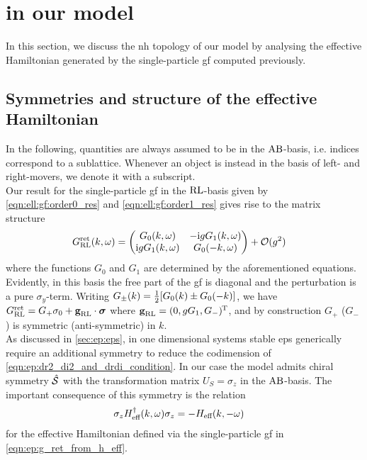 \section{\texorpdfstring{}{EP} in our model}\label{sec:ell:ep:eps_in_our_model}
In this section, we discuss the \gls{nh} topology of our model by analysing the effective Hamiltonian generated by the single-particle \gls{gf} computed previously.
\subsection{Symmetries and structure of the effective Hamiltonian}\label{sec:ell:ep:symmetry_heff}
In the following, quantities are always assumed to be in the $\text{A}\text{B}$-basis, i.e. indices correspond to a sublattice.
Whenever an object is instead in the basis of left- and right-movers, we denote it with a subscript.\\ 
Our result for the single-particle \gls{gf} in the $\text{R}\text{L}$-basis given by \autoref{eqn:ell:gf:order0_res} and \autoref{eqn:ell:gf:order1_res} gives rise to the matrix structure
\begin{align}
G^{\text{ret}}_{\text{R}\text{L}}(k,\omega) &= \begin{pmatrix}
G_0(k,\omega) & -\text{i} gG_1(k,\omega) \\ \text{i} gG_1(k,\omega) & G_0(-k,\omega)
\end{pmatrix} + \mathcal{O}(g^2)
\end{align}
where the functions $G_0$ and $G_1$ are determined by the aforementioned equations.
Evidently, in this basis the free part of the \gls{gf} is diagonal and the perturbation is a pure $\sigma_y$-term.
Writing $G_\pm(k) = \frac{1}{2} \klb*{G_0(k) \pm G_0(-k)}$, we have $G^{\text{ret}}_{\text{R}\text{L}} = G_+ \sigma_0 + \textbf{g}_{\text{R}\text{L}}\cdot \bm{\sigma}$ where $\textbf{g}_{\text{R}\text{L}} = (0, gG_1, G_-)^{\mkern-1.5mu\text{T}}$, and by construction $G_+$ ($G_-$) is symmetric (anti-symmetric) in $k$.\\
As discussed in \autoref{sec:ep:eps}, in one dimensional systems stable \glspl{ep} generically require an additional symmetry to reduce the codimension of \autoref{eqn:ep:dr2_di2_and_drdi_condition}.
In our case the model admits chiral symmetry $\hat{\mathcal{S}}$ with the transformation matrix $U_S=\sigma_z$ in the $\text{A}\text{B}$-basis.
The important consequence of this symmetry is the relation
\begin{align}
\sigma_z H_{\text{eff}}^\dagger(k,\omega) \sigma_z &= -H_{\text{eff}}(k,-\omega) \label{eqn:ell:ep:chiral_h_eff_symmetry}
\end{align}
for the effective Hamiltonian defined via the single-particle \gls{gf} in \autoref{eqn:ep:g_ret_from_h_eff}.
